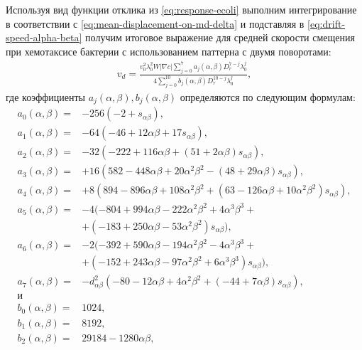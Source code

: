 Используя вид функции отклика из \cref{eq:response-ecoli} выполним интегрирование в соответствии с \cref{eq:mean-displacement-on-md-delta} и подставляя в \cref{eq:drift-speed-alpha-beta} получим итоговое выражение для средней скорости смещения при хемотаксисе бактерии с использованием паттерна с двумя поворотами:
\begin{equation}
    \begin{aligned}
        v_d=\frac{v_0^2\lambda_0^2W|\nabla c|\sum_{j=0}^{7} a_j(\alpha, \beta)D_r^{7-j}\lambda_0^j}{4\sum_{j=0}^{10}b_j(\alpha,\beta)D_r^{10-j}\lambda_0^j},
        \label{eq:drift-speed-solution}
    \end{aligned}
\end{equation}
где коэффициенты $a_j(\alpha,\beta), b_j(\alpha,\beta)$ определяются по следующим формулам:
\begin{equation}
    \begin{aligned}
	a_0(\alpha, \beta) =& - 256\left (-2+s_{\alpha\beta}\right ), \\
	a_1(\alpha, \beta) =& - 64\left (-46+12\alpha\beta+17s_{\alpha\beta}\right ), \\
	a_2(\alpha, \beta) =& - 32\left (-222+116\alpha\beta+(51+2\alpha\beta)s_{\alpha\beta}\right ), \\
	a_3(\alpha, \beta) =& +16\left ( 582-448\alpha\beta+20\alpha^2\beta^2-(48+29\alpha\beta)s_{\alpha\beta} \right ), \\
	a_4(\alpha, \beta) =& +8\left ( 894-896\alpha\beta+108\alpha^2\beta^2+(63-126\alpha\beta+10\alpha^2\beta^2)s_{\alpha\beta} \right ), \\
	a_5(\alpha, \beta) =& - 4( -804+994\alpha\beta-222\alpha^2\beta^2+4\alpha^3\beta^3+\\
    &+(-183+250\alpha\beta-53\alpha^2\beta^2)s_{\alpha\beta} ), \\
	a_6(\alpha, \beta) =& - 2( -392+590\alpha\beta-194\alpha^2\beta^2-4\alpha^3\beta^3+\\
    &+(-152+243\alpha\beta-97\alpha^2\beta^2+6\alpha^3\beta^3)s_{\alpha\beta} ), \\
	a_7(\alpha, \beta) =& - d_{\alpha\beta}^2\left ( -80-12\alpha\beta+4\alpha^2\beta^2+(-44+7\alpha\beta)s_{\alpha\beta} \right ),\\
    \textrm{и}\\
	b_0(\alpha, \beta) =& 1024, \\
	b_1(\alpha, \beta) =& 8192, \\
	b_2(\alpha, \beta) =& 29184 - 1280\alpha\beta, \\

\end{aligned}
\end{equation}
